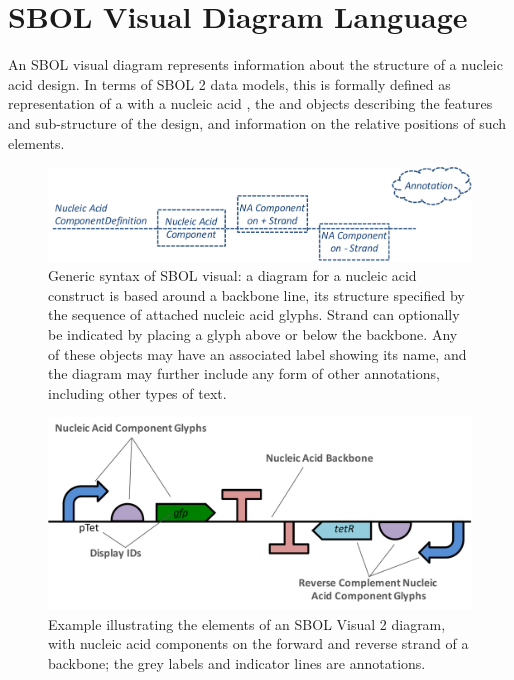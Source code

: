 \section{SBOL Visual Diagram Language}
\label{sec:language}

An SBOL visual diagram represents information about the structure of a nucleic acid design.
In terms of SBOL 2 data models, this is formally defined as representation of a  with a nucleic acid , the  and  objects describing the features and sub-structure of the design, and  information on the relative positions of such elements.

\begin{figure}[h!]
\centering
\includegraphics[width=6in]{figures/SBOLsyntax.pdf}
\caption{Generic syntax of SBOL visual:  
a diagram for a nucleic acid construct is based around a backbone line, its structure specified by the sequence of attached nucleic acid glyphs.  
Strand can optionally be indicated by placing a glyph above or below the backbone.  
Any of these objects may have an associated label showing its name, and the diagram may further include any form of other annotations, including other types of text.}
\label{f:syntax}
\end{figure}

\begin{figure}[h!]
\centering
\includegraphics[width=6in]{figures/SBOLgeneral.pdf}
\caption{Example illustrating the elements of an SBOL Visual 2 diagram, with nucleic acid components on the forward and reverse strand of a backbone; the grey labels and indicator lines are annotations.}
\label{f:example}
\end{figure}

